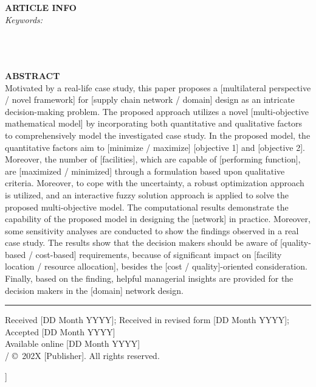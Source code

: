 \documentclass[10pt,twocolumn]{article}
\begin{document}
{%
\noindent
\begin{minipage}[t]{48mm}
  \fontsize{8.5}{11}\selectfont
  \textbf{ARTICLE INFO}\\[4pt]
  \textit{Keywords:}\\
  [Keyword 1]\\
  [Keyword 2]\\
  [Keyword 3]\\
  [Keyword 4]
\end{minipage}%
\hfill
\begin{minipage}[t]{114mm}
  \fontsize{8.5}{11}\selectfont
  \textbf{ABSTRACT}\\[4pt]
  Motivated by a real-life case study, this paper proposes a
  [multilateral perspective / novel framework] for [supply chain
  network / domain] design as an intricate decision-making problem.
  The proposed approach utilizes a novel [multi-objective mathematical
  model] by incorporating both quantitative and qualitative factors to
  comprehensively model the investigated case study. In the proposed
  model, the quantitative factors aim to [minimize / maximize]
  [objective 1] and [objective 2]. Moreover, the number of [facilities],
  which are capable of [performing function], are [maximized / minimized]
  through a formulation based upon qualitative criteria. Moreover, to
  cope with the uncertainty, a robust optimization approach is utilized,
  and an interactive fuzzy solution approach is applied to solve the
  proposed multi-objective model. The computational results demonstrate
  the capability of the proposed model in designing the [network] in
  practice. Moreover, some sensitivity analyses are conducted to show
  the findings observed in a real case study. The results show that the
  decision makers should be aware of [quality-based / cost-based]
  requirements, because of significant impact on [facility location /
  resource allocation], besides the [cost / quality]-oriented
  consideration. Finally, based on the finding, helpful managerial
  insights are provided for the decision makers in the [domain] network
  design.
\end{minipage}

\vspace{6pt}
\noindent\color{elsrule}\rule{\linewidth}{0.5pt}
\vspace{6pt}

{\footnotesize
Received [DD Month YYYY];
Received in revised form [DD Month YYYY];
Accepted [DD Month YYYY]\\
Available online [DD Month YYYY]\\
[ISSN] / \copyright\ 202X [Publisher]. All rights reserved.\par}

\vspace{10pt}
}]%
\end{document}
